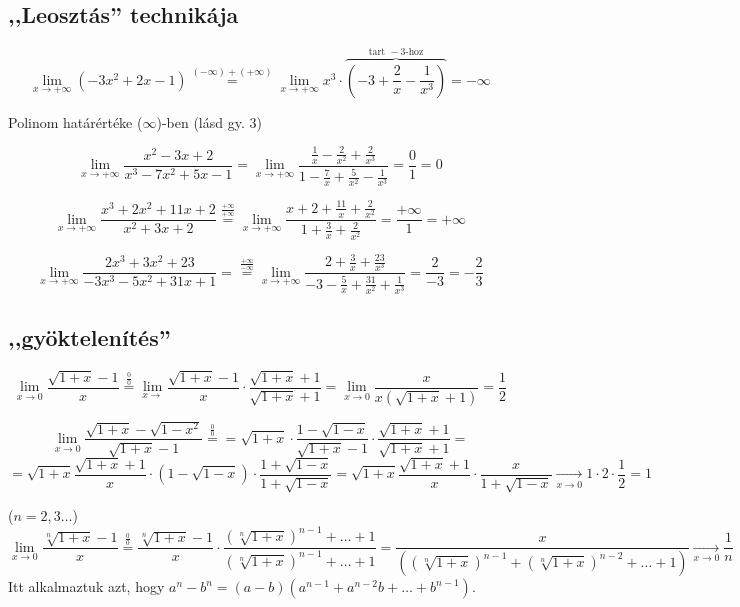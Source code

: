 \documentclass[a4paper,11.5pt]{article}
\begin{document}
	\subsection{,,Leosztás'' technikája}
	\begin{task}
		\[ \lim_{x\to+\infty}\left( -3x^2+2x-1 \right)\overset{(-\infty)+(+\infty)}{=}\lim_{x\to+\infty}x^3\cdot\overbrace{\left(-3+\frac{2}{x}-\frac{1}{x^3}\right)}^{\text{tart }-3\text{-hoz}} =-\infty \]
	\end{task}
	\begin{note}
		Polinom határértéke ($\infty$)-ben (lásd gy. 3)
	\end{note}
	\begin{task}
		\[ \lim_{x\to+\infty}\frac{x^2-3x+2}{x^3-7x^2+5x-1}=\lim_{x\to+\infty}\frac{\frac{1}{x}-\frac{2}{x^2}+\frac{2}{x^3}}{1-\frac{7}{x}+\frac{5}{x^2}-\frac{1}{x^3}}=  \frac{0}{1}=0 \]
	\end{task}
	\begin{task}
		\[ \lim_{x\to+\infty}\frac{x^3+2x^2+11x+2}{x^2+3x+2}\overset{\frac{+\infty}{+\infty}}{=}\lim_{x\to+\infty}\frac{x+2+\frac{11}{x}+\frac{2}{x^2}}{1+\frac{3}{x}+\frac{2}{x^2}}=\frac{+\infty}{1}=+\infty \]
	\end{task}
	\begin{task}
		\[ \lim_{x\to+\infty}\frac{2x^3+3x^2+23}{-3x^3-5x^2+31x+1}=\overset{\frac{+\infty}{-\infty}}{=}\lim_{x\to+\infty}\frac{2+\frac{3}{x}+\frac{23}{x^3}}{-3-\frac{5}{x}+\frac{31}{x^2}+\frac{1}{x^3}}=\frac{2}{-3}=-\frac{2}{3} \]
	\end{task}
	\subsection{,,gyöktelenítés''}
	\begin{task}
		\[ \lim_{x\to0} \frac{\sqrt{1+x}-1}{x}\overset{\frac{0}{0}}{=} \lim_{x\to}\frac{\sqrt{1+x}-1}{x}\cdot\frac{\sqrt{1+x}+1}{\sqrt{1+x}+1}=\lim_{x\to0}\frac{x}{x\left(\sqrt{1+x}+1\right)}=\frac{1}{2} \]
	\end{task}
	\begin{task}
		\[ \lim_{x\to0}\frac{\sqrt{1+x}-\sqrt{1-x^2}}{\sqrt{1+x}-1}\overset{\frac{0}{0}}{=}=\sqrt{1+x}\cdot\frac{1-\sqrt{1-x}}{\sqrt{1+x}-1}\cdot\frac{\sqrt{1+x}+1}{\sqrt{1+x}+1}= \]
		\[ =\sqrt{1+x}\frac{\sqrt{1+x}+1}{x}\cdot(1-\sqrt{1-x})\cdot\frac{1+\sqrt{1-x}}{1+\sqrt{1-x}}=\sqrt{1+x}\frac{\sqrt{1+x}+1}{x}\cdot\frac{x}{1+\sqrt{1-x}}\underset{x\to0}{\longrightarrow}1\cdot2\cdot\frac{1}{2}=1 \]
	\end{task}
	\begin{task}($n=2,3\ldots$)
		\[ \lim_{x\to0}\frac{\sqrt[n]{1+x}-1}{x}\overset{\frac{0}{0}}{=}\frac{\sqrt[n]{1+x}-1}{x}\cdot\frac{(\sqrt[n]{1+x})^{n-1}+\ldots+1 }{(\sqrt[n]{1+x})^{n-1}+\ldots+1 } =\frac{x}{\left((\sqrt[n]{1+x})^{n-1}+(\sqrt[n]{1+x})^{n-2}+\ldots+1\right)} \underset{x\to0}{\longrightarrow}\frac{1}{n} \]
		Itt alkalmaztuk azt, hogy $a^n-b^n=(a-b)(a^{n-1}+a^{n-2}b+\ldots+b^{n-1})$.
	\end{task}
\end{document}
